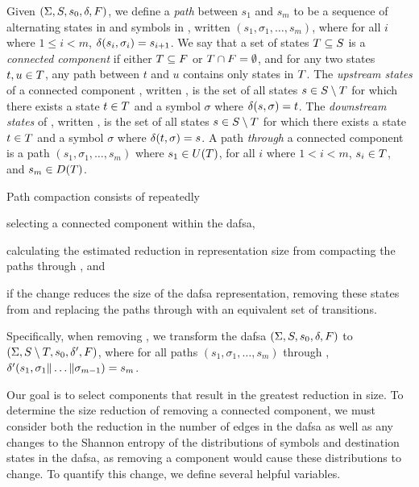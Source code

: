 Given  $(\Sigma, S, s_0, \delta, F)$,
we define a \emph{path} between $s_1$ and $s_m$ to be a sequence of alternating
states in \states and symbols in \symbols, written $(s_1, \sigma_1, \ldots,
s_m)$, where for all $i$ where $1 \le i < m$, $\delta(s_i, \sigma_i)
= s_{i+1}$.
We say that a set of states $T
\subseteq S$ is a \emph{connected component} if either $T
\subseteq F$ or $T \cap F = \emptyset$, and for
any two states $t, u \in T$, 
any path between $t$ and $u$ contains only states in $T$.
The \emph{upstream states} of a connected component \stateset, written
\upstream{\stateset}, is the set of all states $s \in S \setminus
T$ for which there exists a state $t \in T$ and a symbol
$\sigma$ where $\delta(s, \sigma) = t$. The \emph{downstream states} of
\stateset, written \downstream{\stateset}, is the set of all states $s \in
S \setminus T$ for which there exists a state $t \in T$
and a symbol $\sigma$ where $\delta(t, \sigma) = s$. A path \emph{through} a
connected component \stateset is a path $(s_1, \sigma_1, \ldots, s_m)$ where
$s_1 \in U(T)$, for all $i$ where $1 < i < m$, $s_i \in
T$, and $s_m \in D(T)$.

Path compaction consists of repeatedly
\begin{inparaenum}
\item selecting a connected component \stateset within the \ac{dafsa},
\item calculating the estimated reduction in representation size from compacting
  the paths through \stateset, and
\item if the change reduces the size of the \ac{dafsa} representation, removing
  these states from \states and replacing the paths through \stateset with an
  equivalent set of transitions.
\end{inparaenum}
Specifically, when removing \stateset, we transform the \ac{dafsa} $(\Sigma,
S, s_0, \delta, F)$ to $(\Sigma, S \setminus
T, s_0, \delta', F)$, where for all paths $(s_1,
\sigma_1, \ldots, s_m)$ through \stateset, $\delta'(s_1, \sigma_1 \| \dots \|
\sigma_{m-1}) = s_m$.

Our goal is to select components that result in the greatest reduction in size.
To determine the size reduction of removing a connected component, we must
consider both the reduction in the number of edges in the \ac{dafsa} as well as
any changes to the Shannon entropy of the distributions of symbols and
destination states in the \ac{dafsa}, as removing a component would cause these
distributions to change. To quantify this change, we define several helpful
variables.

